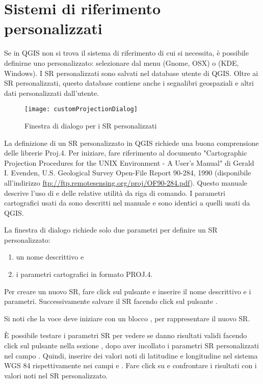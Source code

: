 \section{Sistemi di riferimento personalizzati}\label{sec:customprojections}

Se in QGIS non si trova il sistema di riferimento di cui si necessita, 
è possibile definirne uno personalizzato: selezionare  
dal menu  (Gnome, OSX) o  (KDE, Windows). 
I SR personalizzati sono salvati nel database utente di QGIS. Oltre ai SR personalizzati, 
questo database contiene anche i segnalibri geospaziali e altri dati personalizzati dall'utente.

\begin{figure}[ht]
   \centering
   \texttt{[image: customProjectionDialog]}
   \caption{Finestra di dialogo per i SR personalizzati \nixcaption}\label{fig:customprojections}
\end{figure}

La definizione di un SR personalizzato in QGIS richiede una buona comprensione delle librerie
Proj.4. Per iniziare, fare riferimento al documento "Cartographic Projection Procedures for the UNIX Environment - A User's Manual" di Gerald I. Evenden, U.S. Geological Survey Open-File Report 90-284, 1990 
(disponibile all'indirizzo \url{ftp://ftp.remotesensing.org/proj/OF90-284.pdf}). 
Questo manuale descrive l'uso di  e delle relative utilità da riga di comando. 
I parametri cartografici usati da  sono descritti nel manuale e sono identici a quelli usati da QGIS.

La finestra di dialogo  richiede solo due
parametri per definire un SR personalizzato:
\begin{enumerate}
\item un nome descrittivo e
\item i parametri cartografici in formato PROJ.4.
\end{enumerate}
Per creare un nuovo SR, fare click sul pulsante  e inserire 
il nome descrittivo e i parametri. Successivamente salvare il SR facendo click sul pulsante .

Si noti che la voce  deve iniziare con un blocco , per rappresentare il nuovo SR.

È possibile testare i parametri SR per vedere se danno risultati validi facendo click sul pulsante
 nella sezione , dopo aver incollato i parametri SR personalizzati 
nel campo .
Quindi, inserire dei valori noti di latitudine e longitudine nel sistema WGS 84 rispettivamente nei campi 
 e . 
Fare click su  e confrontare i risultati con i valori noti nel SR personalizzato.

\FloatBarrier
